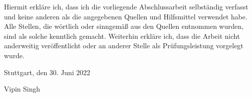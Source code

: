 Hiermit erkläre ich, dass ich die vorliegende Abschlussarbeit selbständig verfasst und  keine anderen als die angegebenen Quellen und Hilfsmittel verwendet habe.
Alle Stellen, die wörtlich oder sinngemäß aus den Quellen entnommen wurden, sind als solche kenntlich gemacht.
Weiterhin erkläre ich, dass die Arbeit nicht anderweitig veröffentlicht oder an anderer Stelle als Prüfungsleistung vorgelegt wurde.

\vspace{2mm}
\begin{flushleft}
	Stuttgart, den 30. Juni 2022
	
	\vspace{10mm}
	\makebox[7cm][l]{\hrulefill}
	
	Vipin Singh
\end{flushleft}